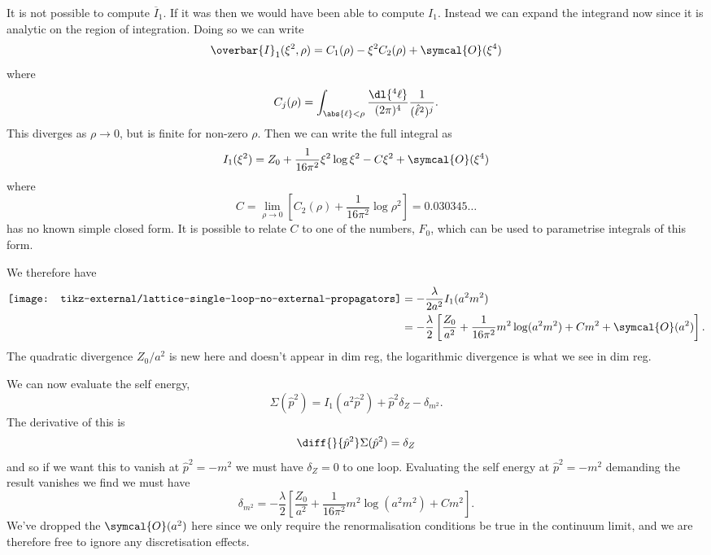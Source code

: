 \documentclass[fleqn]{NotesClass}
\newcommand{\order}{\symcal{O}}
\begin{document}
    It is not possible to compute \(\overbar{I}_1\).
    If it was then we would have been able to compute \(I_1\).
    Instead we can expand the integrand now since it is analytic on the region of integration.
    Doing so we can write
    \begin{equation}
       \overbar{I}_1(\xi^2, \rho) = C_1(\rho) - \xi^2 C_2(\rho) + \order(\xi^4)
    \end{equation}
    where
    \begin{equation}
        C_j(\rho) = \int_{\abs{\ell} < \rho} \frac{\dl{^4\ell}}{(2\pi)^4} \frac{1}{(\hat{\ell}^2)^j}.
    \end{equation}
    This diverges as \(\rho \to 0\), but is finite for non-zero \(\rho\).
    Then we can write the full integral as
    \begin{equation}
        I_1(\xi^2) = Z_0 + \frac{1}{16\pi^2}\xi^2\log \xi^2 - C\xi^2 + \order(\xi^4)
    \end{equation}
    where
    \begin{equation}
        C = \lim_{\rho \to 0} \left[ C_2(\rho) + \frac{1}{16\pi^2} \log \rho^2 \right] = 0.030345\dotso
    \end{equation}
    has no known simple closed form.
    It is possible to relate \(C\) to one of the numbers, \(F_0\), which can be used to parametrise integrals of this form.
    
    We therefore have
    \begin{align}
        \vcenter{\hbox{\texttt{[image: tikz-external/lattice-single-loop-no-external-propagators]}}} &= -\frac{\lambda}{2a^2}I_1(a^2m^2)\\
        &= -\frac{\lambda}{2}\left[ \frac{Z_0}{a^2} + \frac{1}{16\pi^2} m^2 \log(a^2m^2) + Cm^2 + \order(a^2) \right].
    \end{align}
    The quadratic divergence \(Z_0/a^2\) is new here and doesn't appear in dim reg, the logarithmic divergence is what we see in dim reg.
    
    We can now evaluate the self energy,
    \begin{equation}
        \Sigma(\hat{p}^2) = 
        I_1(a^2\hat{p}^2) + \hat{p}^2\delta_Z - \delta_{m^2}.
    \end{equation}
    The derivative of this is
    \begin{equation}
        \diff{}{\hat{p}^2} \Sigma(\hat{p}^2) = \delta_Z
    \end{equation}
    and so if we want this to vanish at \(\hat{p}^2 = -m^2\) we must have \(\delta_Z = 0\) to one loop.
    Evaluating the self energy at \(\hat{p}^2 = -m^2\) demanding the result vanishes we find we must have
    \begin{equation}
        \delta_{m^2} = -\frac{\lambda}{2}\left[ \frac{Z_0}{a^2} + \frac{1}{16\pi^2}m^2\log(a^2m^2) + Cm^2 \right].
    \end{equation}
    We've dropped the \(\order(a^2)\) here since we only require the renormalisation conditions be true in the continuum limit, and we are therefore free to ignore any discretisation effects.
    
\end{document}
